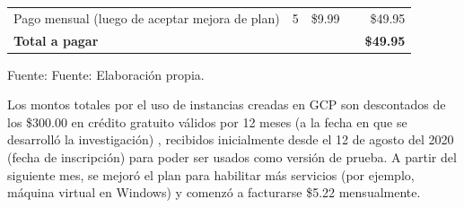\begin{table}[h!]
\begin{tabular}{llrrr}
		Pago mensual (luego de aceptar mejora de plan) & 5 & \$9.99 & \multicolumn{1}{l}{} & \$49.95                                                                              \\
		\rowcolor[HTML]{303498} 
		{\color[HTML]{FFFFFF} \textbf{Total a pagar}} & {\color[HTML]{FFFFFF}} & \multicolumn{1}{l}{\cellcolor[HTML]{303498}{\color[HTML]{FFFFFF} }} & \multicolumn{1}{l}{\cellcolor[HTML]{303498}} & {\color[HTML]{FFFFFF} \textbf{\$49.95}}                                             
	\end{tabular}
	\par	%
	\bigskip
	\begin{flushleft}	%
		\small Fuente: Fuente: Elaboración propia.
	\end{flushleft}
\end{table}

Los montos totales por el uso de instancias creadas en GCP son descontados de los \$300.00 en crédito gratuito válidos por 12 meses (a la fecha en que se desarrolló la investigación) \parencite{ot_googlecloud_freetrial}, recibidos inicialmente desde el 12 de agosto del 2020 (fecha de inscripción) para poder ser usados como versión de prueba. A partir del siguiente mes, se mejoró el plan para habilitar más servicios (por ejemplo, máquina virtual en Windows) y comenzó a facturarse \$5.22 mensualmente.